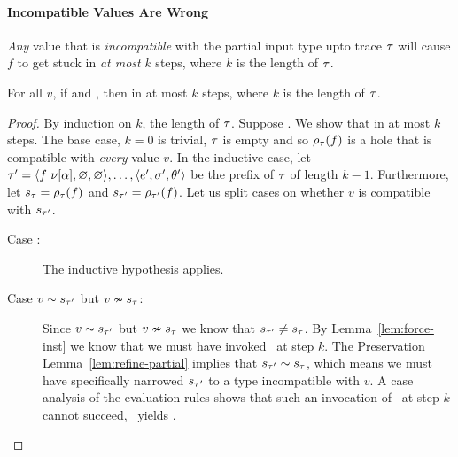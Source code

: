 \paragraph{Incompatible Values Are Wrong}
%
\emph{Any} value that is \emph{incompatible} with
the partial input type upto trace $\tau$ will
cause $f$ to get stuck in \emph{at most} $k$
steps, where $k$ is the length of $\tau$.
%
\begin{lem}
\label{lem:k-stuck}
  For all $v$,
  if  and
     ,
  then
     in at most $k$ steps, where $k$ is the length of $\tau$.
\end{lem}
\begin{proof}
By induction on $k$, the length of $\tau$.
%
Suppose {}.
%
We show that 
in at most $k$ steps.
%
The base case, $k = 0$ is trivial, $\tau$ is empty
and so $\rho_{\tau}(f)$ is a hole that is compatible
with \emph{every} value $v$.
%
In the inductive case, let
$\tau' = \langle f\ \nu[\alpha], \varnothing, \varnothing \rangle,\ldots,\langle e', \sigma', \theta' \rangle$
be the prefix of $\tau$ of length $k-1$.
%
Furthermore, let $s_{\tau} = \rho_{\tau}(f)$ and $s_{\tau'} = \rho_{\tau'}(f)$.
%
Let us split cases on whether $v$ is compatible with $s_{\tau'}$.
%
\begin{description}
\item [Case :]
  The inductive hypothesis applies.

\item [Case $v \sim s_{\tau'}$ but $v \nsim s_{\tau}$:]
  Since $v \sim s_{\tau'}$ but $v \nsim s_{\tau}$ we know
  that $s_{\tau'} \neq s_{\tau}$.
  By Lemma~\ref{lem:force-inst} we know that we must have
  invoked \forcesym\ at step $k$.
  The Preservation Lemma~\ref{lem:refine-partial} implies that
  $s_{\tau'} \sim s_{\tau}$, which means we must have
  specifically narrowed $s_{\tau'}$ to a type incompatible with $v$.
  A case analysis of the evaluation rules shows that such an
  invocation of \forcesym\ at step $k$
  cannot succeed, \ie\ yields \stuck.
\end{description}
\end{proof}


